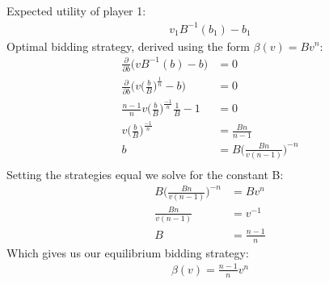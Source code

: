 \documentclass[a4paper,12pt]{article}
\begin{document}
\subsection{}
%
Expected utility of player 1: 
\begin{align*}
v_1B^{-1}(b_1) - b_1
\end{align*}
%
Optimal bidding strategy, derived using the form $\beta(v) = Bv^n$: 
\begin{align*}
\frac{\partial}{\partial b} \bigg( vB^{-1}(b) - b \bigg) &= 0 \\
\frac{\partial}{\partial b} \bigg( v\big( \frac{b}{B} \big)^{\frac{1}{n}} - b \bigg) &= 0 \\
\frac{n-1}{n} v \big( \frac{b}{B} \big)^{\frac{-1}{n}}\frac{1}{B} - 1  &= 0 \\
v \big( \frac{b}{B} \big)^{\frac{-1}{n}}&= \frac{Bn}{n - 1} \\
b &= B\bigg( \frac{Bn}{v(n - 1)} \bigg)^{-n}\\
\end{align*}
%
Setting the strategies equal we solve for the constant B:
%
\begin{align*}
B\bigg( \frac{Bn}{v(n - 1)} \bigg)^{-n} &= Bv^n \\
\frac{Bn}{v(n - 1)} &= v^{-1} \\
B &= \frac{n-1}{n}
\end{align*}
Which gives us our equilibrium bidding strategy: 
%
\begin{align*}
\beta(v) = \frac{n-1}{n}v^n
\end{align*}

\subsection{}


\section{}
\subsection{}
\end{document}
